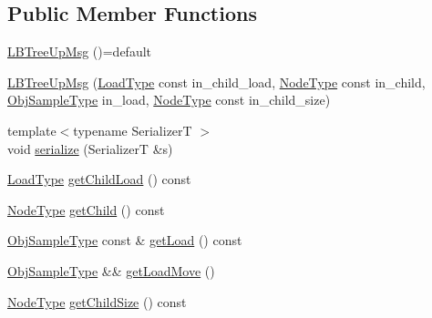 \subsection*{Public Member Functions}
\begin{DoxyCompactItemize}
\item 
\hyperlink{structvt_1_1vrt_1_1collection_1_1lb_1_1_l_b_tree_up_msg_a3dd039d297e1ea09939a13ad5a3722a3}{L\+B\+Tree\+Up\+Msg} ()=default
\item 
\hyperlink{structvt_1_1vrt_1_1collection_1_1lb_1_1_l_b_tree_up_msg_ac2ff0f6b4a047ab11a0cd372c54a141e}{L\+B\+Tree\+Up\+Msg} (\hyperlink{structvt_1_1vrt_1_1collection_1_1lb_1_1_l_b_tree_up_msg_a94e88fdd5142e26330a7feb8769de1bb}{Load\+Type} const in\+\_\+child\+\_\+load, \hyperlink{namespacevt_a866da9d0efc19c0a1ce79e9e492f47e2}{Node\+Type} const in\+\_\+child, \hyperlink{structvt_1_1vrt_1_1collection_1_1lb_1_1_hier_l_b_types_a597a60d517207b90e8c7984eac434e8f}{Obj\+Sample\+Type} in\+\_\+load, \hyperlink{namespacevt_a866da9d0efc19c0a1ce79e9e492f47e2}{Node\+Type} const in\+\_\+child\+\_\+size)
\item 
{\footnotesize template$<$typename SerializerT $>$ }\\void \hyperlink{structvt_1_1vrt_1_1collection_1_1lb_1_1_l_b_tree_up_msg_a6d948678b6361cbaa753d878b72fbce8}{serialize} (SerializerT \&s)
\item 
\hyperlink{structvt_1_1vrt_1_1collection_1_1lb_1_1_l_b_tree_up_msg_a94e88fdd5142e26330a7feb8769de1bb}{Load\+Type} \hyperlink{structvt_1_1vrt_1_1collection_1_1lb_1_1_l_b_tree_up_msg_a24c0c47c9e76945c75b7827ccdb8b446}{get\+Child\+Load} () const
\item 
\hyperlink{namespacevt_a866da9d0efc19c0a1ce79e9e492f47e2}{Node\+Type} \hyperlink{structvt_1_1vrt_1_1collection_1_1lb_1_1_l_b_tree_up_msg_a430d99ecbeb875f33ecd1b4c33c6ea5f}{get\+Child} () const
\item 
\hyperlink{structvt_1_1vrt_1_1collection_1_1lb_1_1_hier_l_b_types_a597a60d517207b90e8c7984eac434e8f}{Obj\+Sample\+Type} const  \& \hyperlink{structvt_1_1vrt_1_1collection_1_1lb_1_1_l_b_tree_up_msg_ab72366267d8219b83509f559ece96d75}{get\+Load} () const
\item 
\hyperlink{structvt_1_1vrt_1_1collection_1_1lb_1_1_hier_l_b_types_a597a60d517207b90e8c7984eac434e8f}{Obj\+Sample\+Type} \&\& \hyperlink{structvt_1_1vrt_1_1collection_1_1lb_1_1_l_b_tree_up_msg_aa5c9744fbb8557e3ec37846d9c8e09e7}{get\+Load\+Move} ()
\item 
\hyperlink{namespacevt_a866da9d0efc19c0a1ce79e9e492f47e2}{Node\+Type} \hyperlink{structvt_1_1vrt_1_1collection_1_1lb_1_1_l_b_tree_up_msg_a6d1dee8d6c40a169c16d1bbddb371478}{get\+Child\+Size} () const
\end{DoxyCompactItemize}

